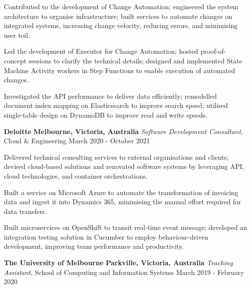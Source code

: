 \documentclass{cv}
\begin{document}
\begin{list}{}{\setlength{\leftmargin}{0pt}}
\begin{list}{\raisebox{2.0pt}{\tiny$\bullet$}\space}{\setlength{\leftmargin}{11.2pt}}
        \item Contributed to the development of Change Automation; engineered the system architecture to organise infrastructure; built services to automate changes on integrated systems, increasing change velocity, reducing errors, and minimising user toil.
        \item Led the development of Executor for Change Automation; hosted proof-of-concept sessions to clarify the technical details; designed and implemented State Machine Activity workers in Step Functions to enable execution of automated changes.
        \item Investigated the API performance to deliver data efficiently; remodelled document index mapping on Elasticsearch to improve search speed; utilised single-table design on DynamoDB to improve read and write speeds.
    \end{list}
\item
    \textbf{Deloitte} \hfill \textbf{Melbourne, Victoria, Australia}%
    \vspace{1.0pt} \newline 
    {\textit{Software Development Consultant}, Cloud \& Engineering} \hfill {March 2020 - October 2021}%
    \begin{list}{\raisebox{2.0pt}{\tiny$\bullet$}\space}{\setlength{\leftmargin}{11.2pt}}
        \itemsep -4.0pt \vspace{-4.0pt}
        \item Delivered technical consulting services to external organisations and clients; devised cloud-based solutions and renovated software systems by leveraging API, cloud technologies, and container orchestrations.
        \item Built a service on Microsoft Azure to automate the transformation of invoicing data and ingest it into Dynamics 365, minimising the manual effort required for data transfers.
        \item Built microservices on OpenShift to transit real-time event message; developed an integration testing solution in Cucumber to employ behaviour-driven development, improving team performance and productivity.
    \end{list}
\item
    \textbf{The University of Melbourne} \hfill \textbf{Parkville, Victoria, Australia}%
    \vspace{1.0pt} \newline 
    {\textit{Teaching Assistant}, School of Computing and Information Systems} \hfill {March 2019 - February 2020}%

\end{list}
\end{document}
